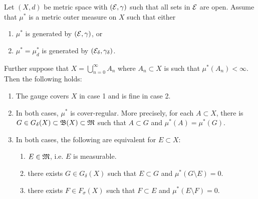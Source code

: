 \documentclass[a4paper]{article}
\renewcommand{\cupinfn}{\bigcup_{n=0}^\infty}
\begin{document}
\begin{thm}
  Let $(X, d)$ be metric space with $(\mathcal{E}, \gamma)$ such that
  all sets in $\mathcal{E}$ are open. Assume that $\mu^*$ is a metric
  outer measure on $X$ such that either

  \begin{enumerate}
    \item $\mu^*$ is generated by $(\mathcal{E}, \gamma)$, or
    \item $\mu^* = \mu^*_d$ is generated by $(\mathcal{E}_\delta,
    \gamma_\delta)$.
  \end{enumerate}

  Further suppose that $X = \cupinfn A_n$ where $A_n \subset X$
  is such that $\mu^*(A_n) < \infty$. Then the following holds:

  \begin{enumerate}
    \item The gauge covers $X$ in case 1 and is fine in case
    2.
    \item In both cases, $\mu^*$ is cover-regular. More precisely,
    for each $A \subset X$, there is $G \in G_\delta(X) \subset \mathfrak{B}(X)
    \subset \mathfrak{M}$ such that $A \subset G$ and $\mu^*(A) = \mu^*(G)$.
    \item In both cases, the following are equivalent for
    $E \subset X$:
    \begin{enumerate}
      \item $E \in \mathfrak{M}$, i.e. $E$ is measurable.
      \item there exists $G \in G_\delta(X)$ such that
      $E \subset G$ and $\mu^*(G \setminus E) = 0$.
      \item there exists $F \in F_\sigma(X)$ such that
      $F \subset E$ and $\mu^* (E \setminus F) = 0$.
    \end{enumerate}
  \end{enumerate}
\end{thm}
\end{document}
